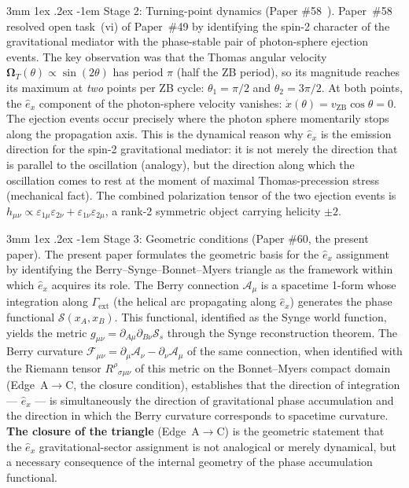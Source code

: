 \documentclass[%
 reprint, amsmath,amssymb, aps, prd, ]{revtex4-2}
\makeatletter
\numberwithin{equation}{section}
\renewcommand\paragraph{%
  \@startsection{paragraph}{4}{\z@}%
    {3mm \@plus 1ex \@minus .2ex}%
    {-1em}%
    {\normalfont\normalsize\itshape}}
\newcommand{\iphase}{\theta}
\newcommand{\vZB}{v_{\mathrm{ZB}}}
\newcommand{\OmT}{\boldsymbol{\Omega}_T}
\newcommand{\ehat}[1]{\hat{e}_{#1}}
\newcommand{\BerryA}{\mathcal{A}}
\newcommand{\BerryF}{\mathcal{F}}
\newcommand{\SyngeS}{\mathcal{S}}
\makeatother
\begin{document}
\paragraph{Stage 2: Turning-point dynamics (Paper \#58~\cite{hanamura58}).}
Paper~\#58 resolved open task~(vi) of Paper~\#49 by identifying the spin-2 character of the gravitational mediator with the phase-stable pair of photon-sphere ejection events.
The key observation was that the Thomas angular velocity $\OmT(\iphase) \propto \sin(2\iphase)$ has period $\pi$ (half the ZB period), so its magnitude reaches its maximum at \emph{two} points per ZB cycle: $\iphase_1 = \pi/2$ and $\iphase_2 = 3\pi/2$.
At both points, the $\ehat{x}$ component of the photon-sphere velocity vanishes: $\dot{x}(\iphase) = \vZB\cos\iphase = 0$.
The ejection events occur precisely where the photon sphere momentarily stops along the propagation axis.
This is the dynamical reason why $\ehat{x}$ is the emission direction for the spin-2 gravitational mediator: it is not merely the direction that is parallel to the oscillation (analogy), but the direction along which the oscillation comes to rest at the moment of maximal Thomas-precession stress (mechanical fact).
The combined polarization tensor of the two ejection events is $h_{\mu\nu} \propto \varepsilon_{1\mu}\varepsilon_{2\nu} + \varepsilon_{1\nu}\varepsilon_{2\mu}$, a rank-2 symmetric object carrying helicity $\pm 2$.

\paragraph{Stage 3: Geometric conditions (Paper \#60, the present paper).}
The present paper formulates the geometric basis for the $\ehat{x}$ assignment by identifying the Berry--Synge--Bonnet--Myers triangle as the framework within which $\ehat{x}$ acquires its role.
The Berry connection $\BerryA_\mu$ is a spacetime 1-form whose integration along $\Gamma_\mathrm{ext}$ (the helical arc propagating along $\ehat{x}$) generates the phase functional $\SyngeS(x_A,x_B)$.
This functional, identified as the Synge world function, yields the metric $g_{\mu\nu} = \partial_{A\mu}\partial_{B\nu}\SyngeS_s$ through the Synge reconstruction theorem.
The Berry curvature $\BerryF_{\mu\nu} = \partial_\mu\BerryA_\nu - \partial_\nu\BerryA_\mu$ of the same connection, when identified with the Riemann tensor $R^\rho{}_{\sigma\mu\nu}$ of this metric on the Bonnet--Myers compact domain (Edge~A$\to$C, the closure condition), establishes that the direction of integration --- $\ehat{x}$ --- is simultaneously the direction of gravitational phase accumulation and the direction in which the Berry curvature corresponds to spacetime curvature.
\textbf{The closure of the triangle} (Edge~A$\to$C) is the geometric statement that the $\ehat{x}$ gravitational-sector assignment is not analogical or merely dynamical, but a necessary consequence of the internal geometry of the phase accumulation functional.
\end{document}
